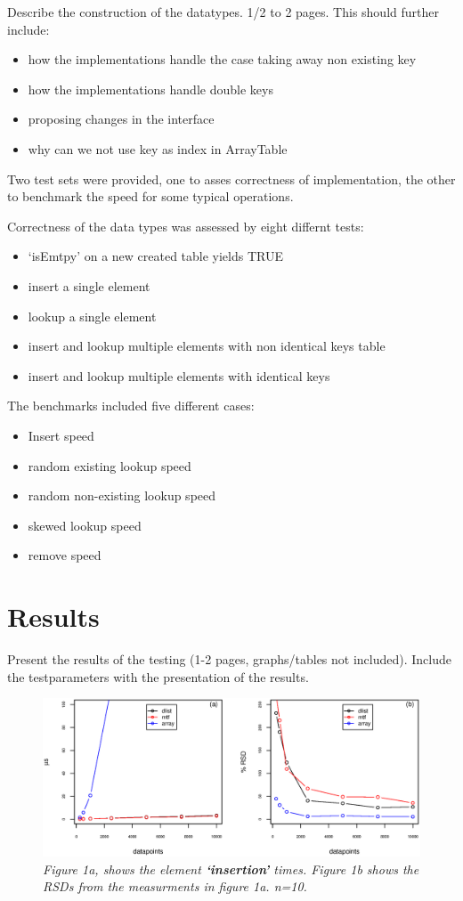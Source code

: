 \documentclass[a4paper,11pt,twoside]{article}
\begin{document}
Describe the construction of the datatypes. 1/2 to 2 pages. This
should further include:

\begin{itemize}
\item how the implementations handle the case taking away non existing
  key
\item how the implementations handle double keys
\item proposing changes in the interface
\item why can we not use key as index in ArrayTable
\end{itemize}

Two test sets were provided, one to asses correctness of
implementation, the other to benchmark the speed for some typical
operations. 

Correctness of the data types was assessed by eight
differnt tests: 
\begin{itemize}
\item `isEmtpy' on a new created table yields TRUE
\item insert a single element
\item lookup a single element
\item insert and lookup multiple elements with non identical keys
table
\item insert and lookup multiple elements with identical keys
\end{itemize}

The benchmarks included five different cases: 
\begin{itemize}
\item Insert speed
\item random existing lookup speed
\item random non-existing lookup speed 
\item skewed lookup speed
\item remove speed  
\end{itemize}

\section{Results}
Present the results of the testing (1-2 pages, graphs/tables not
included). Include the testparameters with the presentation of the
results.
\begin{figure}[H] 
\centering 
\includegraphics[width=\textwidth]{figures/fig1.eps}
\caption{\textit{Figure 1a, shows the element \textbf{`insertion'}
    times. Figure 1b shows the RSDs from the measurments in figure 1a. n=10.}}
\end{figure}
\end{document}
